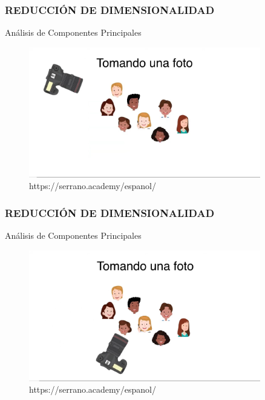 \documentclass{beamer}
\begin{document}
\begin{frame}
\frametitle{REDUCCIÓN DE DIMENSIONALIDAD}
\begin{block}{Análisis de Componentes Principales}	
	\begin{figure}
		\includegraphics[width=0.9\textwidth]{PCA/IMG_3526.jpg}
		\caption{https://serrano.academy/espanol/}
	\end{figure}
\end{block}
\end{frame}

\begin{frame}
\frametitle{REDUCCIÓN DE DIMENSIONALIDAD}
\begin{block}{Análisis de Componentes Principales}	
	\begin{figure}
		\includegraphics[width=0.9\textwidth]{PCA/IMG_3527.jpg}
		\caption{https://serrano.academy/espanol/}
	\end{figure}
\end{block}
\end{frame}
\end{document}
